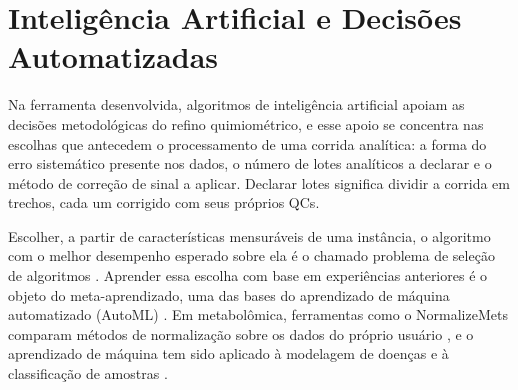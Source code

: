 
\makeatletter
{}
\makeatother
\section{Inteligência Artificial e Decisões Automatizadas}

Na ferramenta desenvolvida, algoritmos de inteligência artificial apoiam as decisões metodológicas do refino quimiométrico, e esse apoio se concentra nas escolhas que antecedem o processamento de uma corrida analítica: a forma do erro sistemático presente nos dados, o número de lotes analíticos a declarar e o método de correção de sinal a aplicar. Declarar lotes significa dividir a corrida em trechos, cada um corrigido com seus próprios QCs.

Escolher, a partir de características mensuráveis de uma instância, o algoritmo com o melhor desempenho esperado sobre ela é o chamado problema de seleção de algoritmos \cite{rice1976algorithm}. Aprender essa escolha com base em experiências anteriores é o objeto do meta-aprendizado, uma das bases do aprendizado de máquina automatizado (AutoML) \cite{brazdil2022metalearning}. Em metabolômica, ferramentas como o NormalizeMets comparam métodos de normalização sobre os dados do próprio usuário \cite{de2018normalizemets}, e o aprendizado de máquina tem sido aplicado à modelagem de doenças e à classificação de amostras \cite{galal2022applications}.

